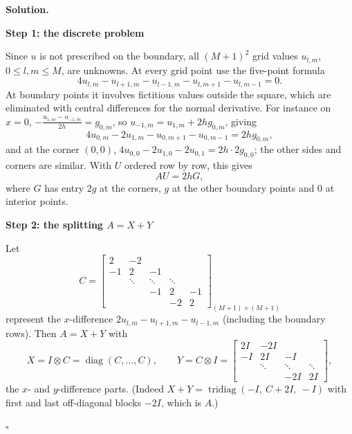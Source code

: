 \documentclass[11pt,a4paper]{article}
\newenvironment{solution}
  {\par\noindent\textbf{Solution.}\par\nobreak}
  {\par\hfill\(\square\)\par}
\newcommand{\step}[1]{\par\addvspace{0.5em}\noindent\textbf{#1}\par\nobreak}
\begin{document}
\begin{solution}
\step{Step 1: the discrete problem}
Since \(u\) is not prescribed on the boundary, all \((M+1)^2\) grid
values \(u_{l,m}\), \(0\le l,m\le M\), are unknowns.  At every grid
point use the five-point formula
\[
  4u_{l,m}-u_{l+1,m}-u_{l-1,m}-u_{l,m+1}-u_{l,m-1}=0 .
\]
At boundary points it involves fictitious values outside the square,
which are eliminated with central differences for the normal
derivative.  For instance on \(x=0\), \(-\frac{u_{1,m}-u_{-1,m}}{2h}=g_{0,m}\),
so \(u_{-1,m}=u_{1,m}+2hg_{0,m}\), giving
\[
  4u_{0,m}-2u_{1,m}-u_{0,m+1}-u_{0,m-1}=2hg_{0,m},
\]
and at the corner \((0,0)\),
\(4u_{0,0}-2u_{1,0}-2u_{0,1}=2h\cdot2g_{0,0}\); the other sides and
corners are similar.  With \(U\) ordered row by row, this gives
\[
  AU=2hG,
\]
where \(G\) has entry \(2g\) at the corners, \(g\) at the other boundary
points and \(0\) at interior points.

\step{Step 2: the splitting \(A=X+Y\)}
Let
\[
  C=\begin{bmatrix}
    2&-2&&&\\
    -1&2&-1&&\\
    &\ddots&\ddots&\ddots&\\
    &&-1&2&-1\\
    &&&-2&2
  \end{bmatrix}_{(M+1)\times(M+1)}
\]
represent the \(x\)-difference \(2u_{l,m}-u_{l+1,m}-u_{l-1,m}\)
(including the boundary rows).  Then \(A=X+Y\) with
\[
  X=I\otimes C=\operatorname{diag}(C,\dots,C),\qquad
  Y=C\otimes I=\begin{bmatrix}
    2I&-2I&&\\
    -I&2I&-I&\\
    &\ddots&\ddots&\ddots\\
    &&-2I&2I
  \end{bmatrix},
\]
the \(x\)- and \(y\)-difference parts.  (Indeed
\(X+Y=\operatorname{tridiag}(-I,\ C+2I,\ -I)\) with first and last
off-diagonal blocks \(-2I\), which is \(A\).)


\end{solution}
\end{document}
